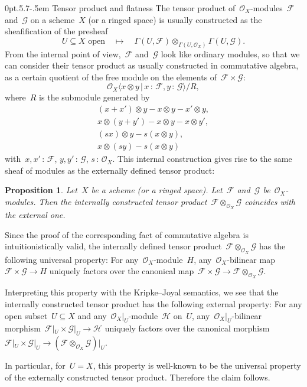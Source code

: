 \documentclass[10pt,reqno,a4paper]{amsbook}
\makeatletter
\theoremstyle{definition}
\theoremstyle{plain}
\newtheorem{prop}[defn]{Proposition}
\theoremstyle{remark}
\newcommand{\F}{\mathcal{F}}
\newcommand{\G}{\mathcal{G}}
\renewcommand{\H}{\mathcal{H}}
\renewcommand{\O}{\mathcal{O}}
\newcommand{\?}{\,{:}\,}
\renewcommand{\_}{\mathpunct{.}\,}
\renewenvironment{proof}[1][\proofname]{\par
  \pushQED{\qed}%
  \normalfont \topsep6\p@\@plus6\p@\relax
  \trivlist
  \item[\hskip\labelsep
        \itshape
    #1\@addpunct{.}]\ignorespaces
}{%
  \popQED\endtrivlist\@endpefalse
}
\def\subsection{\@startsection{subsection}{2}%
  {0pt}{.5\linespacing\@plus.7\linespacing}{-.5em}%
  {\normalfont\bfseries}}
\makeatother
\begin{document}
\subsection{Tensor product and flatness} The tensor product
of~$\O_X$-modules~$\F$ and~$\G$ on a scheme~$X$ (or a ringed space) is usually
constructed as the sheafification of the presheaf
\[ \text{$U \subseteq X$ open} \quad\longmapsto\quad \Gamma(U,\F) \otimes_{\Gamma(U,\O_X)}
\Gamma(U,\G). \]
From the internal point of view,~$\F$ and~$\G$ look like ordinary modules, so
that we can consider their tensor product as usually constructed in
commutative algebra, as a certain quotient of the free module on the elements
of~$\F \times \G$:
\[ \O_X\langle x \otimes y \,|\, x\?\F, y\?\G \rangle / R, \]
where~$R$ is the submodule generated by
\begin{gather*}
  (x+x') \otimes y - x \otimes y - x' \otimes y, \\
  x \otimes (y+y') - x \otimes y - x \otimes y', \\
  (sx) \otimes y - s(x \otimes y), \\
  x \otimes (sy) - s(x \otimes y)
\end{gather*}
with~$x,x'\?\F$, $y,y'\?\G$, $s\?\O_X$.
This internal construction gives rise to the same sheaf
of modules as the externally defined tensor product:

\begin{prop}\label{prop:internal-tensor-product}
Let~$X$ be a scheme (or a ringed space). Let~$\F$ and~$\G$
be~$\O_X$-modules. Then the internally constructed tensor product~$\F
\otimes_{\O_X} \G$ coincides with the external one.
\end{prop}
\begin{proof}
Since the proof of the corresponding fact of commutative algebra is
intuitionistically valid, the internally defined tensor product~$\F \otimes_{\O_X} \G$
has the following universal property: For any~$\O_X$-module~$H$,
any~$\O_X$-bilinear map~$\F \times \G \to H$ uniquely factors over the
canonical map~$\F \times \G \to \F \otimes_{\O_X} \G$.

Interpreting this property with the Kripke--Joyal semantics, we see that the
internally constructed tensor product has the following external property:
For any open subset~$U \subseteq X$ and any~$\O_X|_U$-module~$\H$ on~$U$,
any~$\O_X|_U$-bilinear morphism~$\F|_U \times \G|_U \to \H$ uniquely factors over the
canonical morphism~$\F|_U \times \G|_U \to (\F \otimes_{\O_X} \G)|_U$.

In particular, for~$U = X$, this property is well-known to be the universal
property of the externally constructed tensor product. Therefore the
claim follows.
\end{proof}
\end{document}
